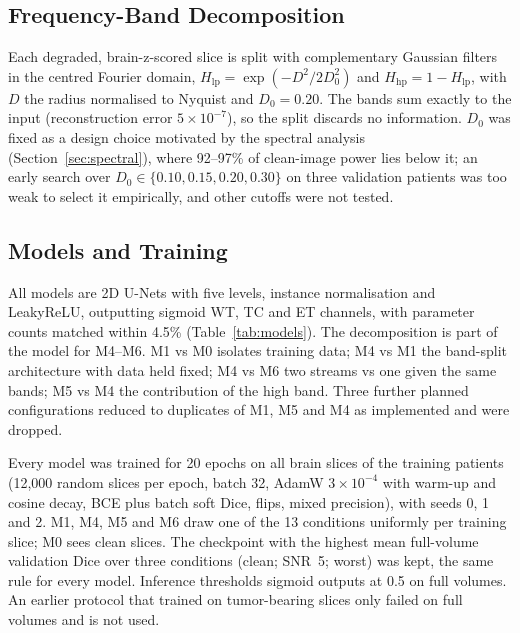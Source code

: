 \documentclass[conference]{IEEEtran}
\begin{document}
\subsection{Frequency-Band Decomposition}
Each degraded, brain-z-scored slice is split with complementary Gaussian filters in the centred Fourier domain,
$H_{\mathrm{lp}} = \exp(-D^2/2D_0^2)$ and $H_{\mathrm{hp}} = 1 - H_{\mathrm{lp}}$, with $D$ the radius normalised
to Nyquist and $D_0 = 0.20$. The bands sum exactly to the input (reconstruction error $5\times10^{-7}$), so the
split discards no information. $D_0$ was fixed as a design choice motivated by the spectral analysis
(Section~\ref{sec:spectral}), where 92--97\% of clean-image power lies below it; an early search over
$D_0 \in \{0.10, 0.15, 0.20, 0.30\}$ on three validation patients was too weak to select it empirically, and
other cutoffs were not tested.

\subsection{Models and Training}
All models are 2D U-Nets with five levels, instance normalisation and LeakyReLU, outputting sigmoid WT, TC and
ET channels, with parameter counts matched within 4.5\% (Table~\ref{tab:models}). The decomposition is part of
the model for M4--M6. M1 vs M0 isolates training data; M4 vs M1 the band-split architecture with data held fixed;
M4 vs M6 two streams vs one given the same bands; M5 vs M4 the contribution of the high band. Three further
planned configurations reduced to duplicates of M1, M5 and M4 as implemented and were dropped.

Every model was trained for 20 epochs on all brain slices of the training patients (12{,}000 random slices per
epoch, batch 32, AdamW $3\times10^{-4}$ with warm-up and cosine decay, BCE plus batch soft Dice, flips, mixed
precision), with seeds 0, 1 and 2. M1, M4, M5 and M6 draw one of the 13 conditions uniformly per training slice;
M0 sees clean slices. The checkpoint with the highest mean full-volume validation Dice over three conditions
(clean; SNR~5; worst) was kept, the same rule for every model. Inference thresholds sigmoid outputs at 0.5 on
full volumes. An earlier protocol that trained on tumor-bearing slices only failed on full volumes and is not
used.

\begin{table}[t]
\caption{Models (parameter counts matched within 4.5\%)}
\label{tab:models}
\centering\footnotesize
{}
\end{table}
\end{document}

